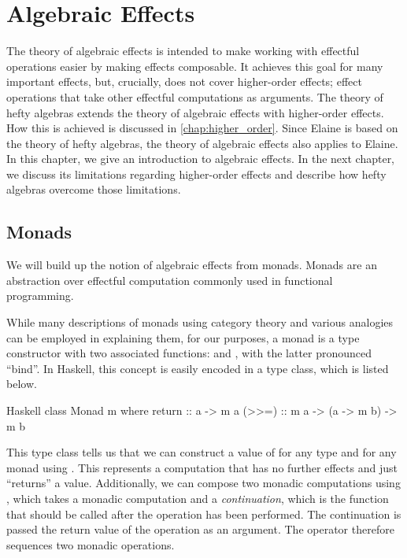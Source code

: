 \chapter{Algebraic Effects}\label{chap:algebraic_effects}

The theory of algebraic effects is intended to make working with effectful operations easier by making effects composable. It achieves this goal for many important effects, but, crucially, does not cover higher-order effects; effect operations that take other effectful computations as arguments. The theory of hefty algebras extends the theory of algebraic effects with higher-order effects. How this is achieved is discussed in \cref{chap:higher_order}. Since Elaine is based on the theory of hefty algebras, the theory of algebraic effects also applies to Elaine. In this chapter, we give an introduction to algebraic effects. In the next chapter, we discuss its limitations regarding higher-order effects and describe how hefty algebras overcome those limitations.


\section{Monads}


We will build up the notion of algebraic effects from monads. Monads are an abstraction over effectful computation commonly used in functional programming. \citationneeded

While many descriptions of monads using category theory and various analogies can be employed in explaining them, for our purposes, a monad is a type constructor  with two associated functions:  and \hs{>>=}, with the latter pronounced ``bind''. In Haskell, this concept is easily encoded in a type class, which is listed below.

\begin{lst}{Haskell}
class Monad m where
  return :: a -> m a
  (>>=)  :: m a -> (a -> m b) -> m b
\end{lst}
%
This type class tells us that we can construct a value of  for any type  and for any monad  using . This represents a computation that has no further effects and just ``returns'' a value. Additionally, we can compose two monadic computations using \hs{>>=}, which takes a monadic computation and a \emph{continuation}, which is the function that should be called after the operation has been performed. The continuation is passed the return value of the operation as an argument. The \hs{>>=} operator therefore sequences two monadic operations.

